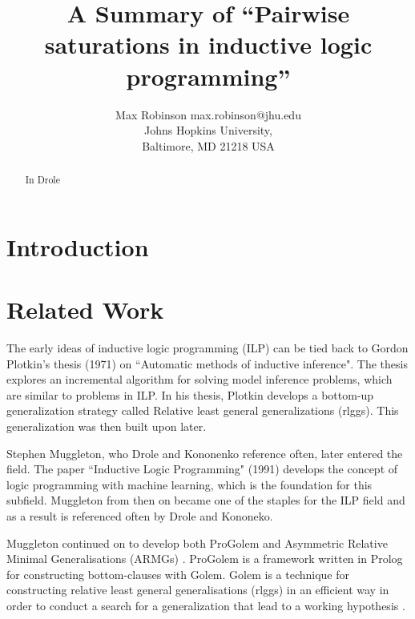 \documentclass[jair,twoside,11pt,theapa]{article}
\begin{document}
\title{A Summary of ``Pairwise saturations in inductive logic programming''}

\author{\name Max Robinson \email max.robinson@jhu.edu \\
       \addr Johns Hopkins University,\\
       Baltimore, MD 21218 USA
   }


\maketitle

\begin{abstract}
In Drole \cite{Drole2017}
\end{abstract}

\section{Introduction}
\label{Introduction}

\section{Related Work}
\label{relatedwork}
The early ideas of inductive logic programming (ILP) can be tied back to Gordon Plotkin's thesis (1971) on ``Automatic methods of inductive inference". The thesis explores an incremental algorithm for solving model inference problems, which are similar to problems in ILP. In his thesis, Plotkin develops a bottom-up generalization strategy called Relative least general generalizations (rlggs). This generalization was then built upon later.

Stephen Muggleton, who Drole and Kononenko reference often, later entered the field. The paper ``Inductive Logic Programming" (1991) develops the concept of logic programming with machine learning, which is the foundation for this subfield. Muggleton from then on became one of the staples for the ILP field and as a result is referenced often by Drole and Kononeko. 

Muggleton continued on to develop both ProGolem and Asymmetric Relative Minimal Generalisations (ARMGs) \cite{ProGolem}. ProGolem is a framework written in Prolog for constructing bottom-clauses with Golem. Golem is a technique for constructing relative least general generalisations (rlggs) in an efficient way in order to conduct a search for a generalization that lead to a working hypothesis \cite{1990}. 
\end{document}

